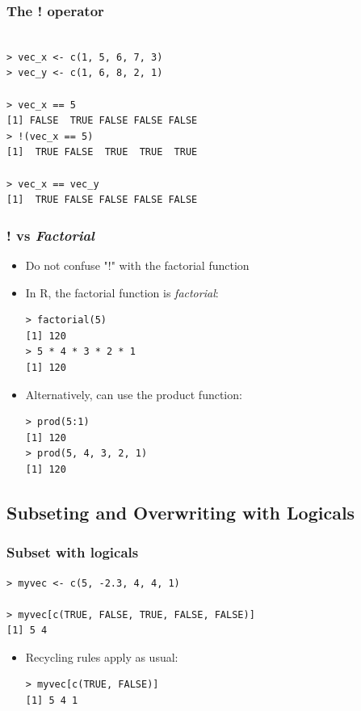\documentclass[xcolor=dvipsnames, xcolor=table]{beamer} %
\theoremstyle{mystyle}
\begin{document}
\begin{frame}[fragile] %

\frametitle{The ! operator}

\begin{verbatim}

> vec_x <- c(1, 5, 6, 7, 3)
> vec_y <- c(1, 6, 8, 2, 1)

> vec_x == 5
[1] FALSE  TRUE FALSE FALSE FALSE
> !(vec_x == 5)
[1]  TRUE FALSE  TRUE  TRUE  TRUE

> vec_x == vec_y
[1]  TRUE FALSE FALSE FALSE FALSE

\end{verbatim}
\end{frame}

\begin{frame}[fragile] %

\frametitle{! vs \textit{Factorial}}

\begin{itemize}
\item Do not confuse "!" with the factorial function
\item In R, the factorial function is \textit{factorial}:

\begin{verbatim}
> factorial(5)
[1] 120
> 5 * 4 * 3 * 2 * 1
[1] 120
\end{verbatim}

\item Alternatively, can use the product function:
\begin{verbatim}
> prod(5:1)
[1] 120
> prod(5, 4, 3, 2, 1)
[1] 120

\end{verbatim}
\end{itemize}


\end{frame}

\subsection{Subseting and Overwriting with Logicals}

\begin{frame}[fragile] %
\frametitle{Subset with logicals}

\begin{verbatim}
> myvec <- c(5, -2.3, 4, 4, 1)

> myvec[c(TRUE, FALSE, TRUE, FALSE, FALSE)]
[1] 5 4
\end{verbatim}

\begin{itemize}
\item Recycling rules apply as usual:

\begin{verbatim}
> myvec[c(TRUE, FALSE)]
[1] 5 4 1
\end{verbatim}
\end{itemize}

\end{frame}
\end{document}
